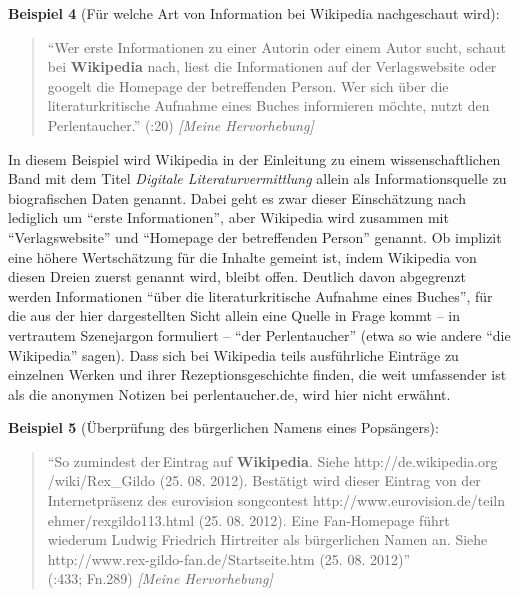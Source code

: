 \documentclass[fontsize=12pt]{scrartcl}
\begin{document}
\textbf{Beispiel 4} (F\"ur welche Art von Information bei Wi\-ki\-pe\-dia nachgeschaut wird):

\singlespacing
\begin{quote}
"`Wer erste Informationen zu einer Autorin oder einem Autor sucht, schaut bei \textbf{Wi\-ki\-pe\-dia} nach, liest die Informationen auf der Verlagswebsite oder \flq googelt\frq \,\,die Homepage der betreffenden Person. Wer sich \"uber die li\-te\-ra\-tur\-kritische Aufnahme eines Buches informieren m\"ochte, nutzt den \flq Per\-len\-tau\-cher\frq."' (\cite{Neuhaus2010}:20) \textit{[Meine Hervorhebung]}
\end{quote}
\onehalfspacing

In diesem Beispiel wird Wi\-ki\-pe\-dia in der Einleitung zu einem wissenschaftlichen Band mit dem Titel \textit{Digitale Li\-te\-ra\-tur\-ver\-mitt\-lung} allein als Informationsquelle zu biografischen Daten genannt. Dabei geht es zwar dieser Einsch\"atzung nach lediglich um "`erste Informationen"', aber Wi\-ki\-pe\-dia wird zusammen mit "`Verlagswebsite"' und "`Homepage der betreffenden Person"' genannt. Ob implizit eine h\"ohere Wertsch\"at\-zung f\"ur die Inhalte gemeint ist, indem Wi\-ki\-pe\-dia von diesen Dreien zuerst genannt wird, bleibt offen. Deutlich davon abgegrenzt werden Informationen "`\"uber die li\-te\-ra\-tur\-kritische Aufnahme eines Buches"', f\"ur die aus der \mbox{hier} dargestellten Sicht allein eine Quelle in Frage kommt -- in vertrautem Szenejargon formuliert -- "`der Per\-len\-tau\-cher"' (etwa so wie andere "`die Wi\-ki\-pe\-dia"' sagen). Dass sich bei Wi\-ki\-pe\-dia teils ausf\"uhrliche Eintr\"age zu einzelnen Werken und ihrer Rezeptionsgeschichte finden, die weit umfassender ist als die anonymen Notizen bei per\-len\-tau\-cher.de, wird \mbox{hier} nicht erw\"ahnt.

\textbf{Beispiel 5} (\"Uberpr\"ufung des b\"urgerlichen Namens eines Pops\"angers):
\singlespacing
\begin{quote}
"`So zumindest der\,Eintrag auf \textbf{Wikipedia}. Siehe http://de.wikipedia.org
/wiki/Rex\_Gildo (25. 08. 2012). Best\"atigt wird dieser Eintrag von der Internetpr\"asenz des eurovision songcontest http://www.eurovision.de/teiln
ehmer/rexgildo113.html (25. 08. 2012). Eine Fan-Homepage f\"uhrt wiederum Ludwig Friedrich Hirtreiter als b\"urgerlichen Namen an. Siehe http://www.rex-gildo-fan.de/Startseite.htm (25. 08. 2012)"'\\ (\cite{Assmann2014}:433; Fn.289) \textit{[Meine Hervorhebung]}
\end{quote}
\onehalfspacing
\end{document}
